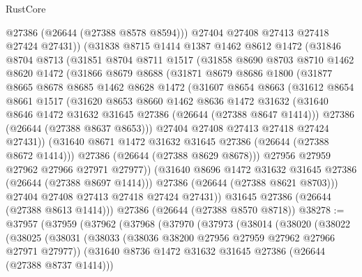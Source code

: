 \begin{lexlean}{RustCore}
\begin{coremodule}
          @27386
          (@26644 (@27388 @8578 @8594)))
        @27404
        @27408
        @27413
        @27418
        @27424
        @27431))
    (@31838
      @8715
      @1414
      @1387
      @1462
      @8612
      @1472
      (@31846
        @8704
        @8713
        (@31851
          @8704
          @8711
          @1517
          (@31858
            @8690
            @8703
            @8710
            @1462
            @8620
            @1472
            (@31866
              @8679
              @8688
              (@31871
                @8679
                @8686
                @1800
                (@31877
                  @8665
                  @8678
                  @8685
                  @1462
                  @8628
                  @1472
                  (@31607
                    @8654
                    @8663
                    (@31612
                      @8654
                      @8661
                      @1517
                      (@31620
                        @8653
                        @8660
                        @1462
                        @8636
                        @1472
                        @31632
                        (@31640 @8646 @1472 @31632 @31645 @27386 (@26644 (@27388 @8647 @1414)))
                        @27386
                        (@26644 (@27388 @8637 @8653)))
                      @27404
                      @27408
                      @27413
                      @27418
                      @27424
                      @27431))
                  (@31640 @8671 @1472 @31632 @31645 @27386 (@26644 (@27388 @8672 @1414)))
                  @27386
                  (@26644 (@27388 @8629 @8678)))
                @27956
                @27959
                @27962
                @27966
                @27971
                @27977))
            (@31640 @8696 @1472 @31632 @31645 @27386 (@26644 (@27388 @8697 @1414)))
            @27386
            (@26644 (@27388 @8621 @8703)))
          @27404
          @27408
          @27413
          @27418
          @27424
          @27431))
      @31645
      @27386
      (@26644 (@27388 @8613 @1414)))
    @27386
    (@26644 (@27388 @8570 @8718))
@38278 := @37957
    (@37959
      (@37962
        (@37968
          (@37970
            (@37973
              (@38014
                (@38020
                  (@38022
                    (@38025
                      (@38031
                        (@38033 (@38036 @38200 @27956 @27959 @27962 @27966 @27971 @27977))
                        (@31640 @8736 @1472 @31632 @31645 @27386 (@26644 (@27388 @8737 @1414)))

\end{coremodule}
\end{lexlean}
